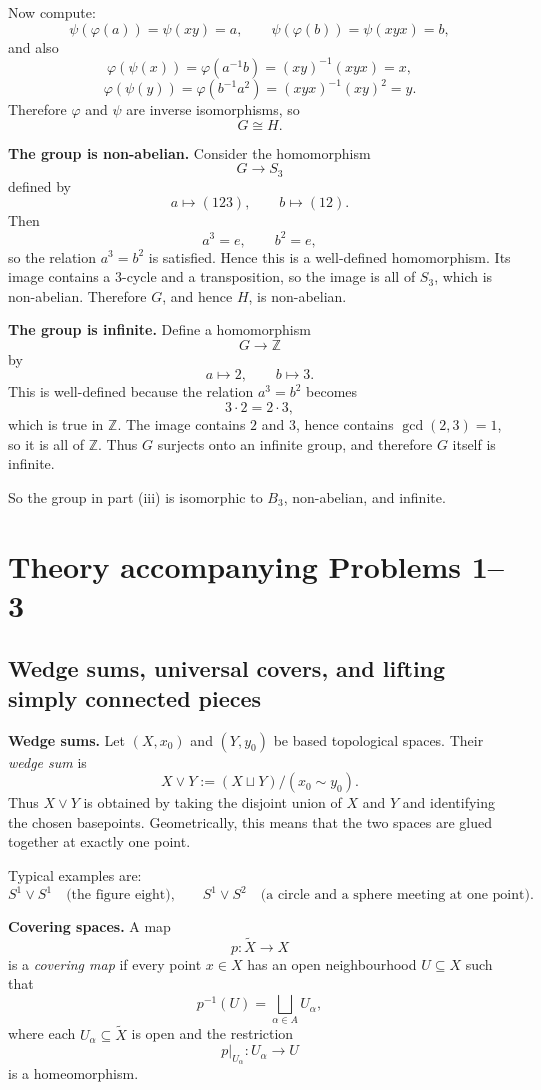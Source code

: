 \documentclass[12pt,a4paper]{article}
\theoremstyle{notespace}
\begin{document}
Now compute:
\[
\psi(\varphi(a))=\psi(xy)=a,\qquad
\psi(\varphi(b))=\psi(xyx)=b,
\]
and also
\[
\varphi(\psi(x))=\varphi(a^{-1}b)=(xy)^{-1}(xyx)=x,
\]
\[
\varphi(\psi(y))=\varphi(b^{-1}a^2)=(xyx)^{-1}(xy)^2=y.
\]
Therefore \(\varphi\) and \(\psi\) are inverse isomorphisms, so
\[
G\cong H.
\]

\textbf{The group is non-abelian.}
Consider the homomorphism
\[
G\to S_3
\]
defined by
\[
a\mapsto (123),\qquad b\mapsto (12).
\]
Then
\[
a^3=e,\qquad b^2=e,
\]
so the relation \(a^3=b^2\) is satisfied. Hence this is a well-defined homomorphism. Its image contains a \(3\)-cycle and a transposition, so the image is all of \(S_3\), which is non-abelian. Therefore \(G\), and hence \(H\), is non-abelian.

\textbf{The group is infinite.}
Define a homomorphism
\[
G\to \mathbb{Z}
\]
by
\[
a\mapsto 2,\qquad b\mapsto 3.
\]
This is well-defined because the relation \(a^3=b^2\) becomes
\[
3\cdot 2 = 2\cdot 3,
\]
which is true in \(\mathbb{Z}\). The image contains \(2\) and \(3\), hence contains \(\gcd(2,3)=1\), so it is all of \(\mathbb{Z}\). Thus \(G\) surjects onto an infinite group, and therefore \(G\) itself is infinite.

So the group in part (iii) is isomorphic to \(B_3\), non-abelian, and infinite.

\section{Theory accompanying Problems 1--3}

\subsection{Wedge sums, universal covers, and lifting simply connected pieces}

\textbf{Wedge sums.}
Let \((X,x_0)\) and \((Y,y_0)\) be based topological spaces. Their \emph{wedge sum} is
\[
X\vee Y := (X\sqcup Y)/(x_0\sim y_0).
\]
Thus \(X\vee Y\) is obtained by taking the disjoint union of \(X\) and \(Y\) and identifying the chosen basepoints. Geometrically, this means that the two spaces are glued together at exactly one point.

Typical examples are:
\[
S^1\vee S^1 \quad\text{(the figure eight),}
\qquad
S^1\vee S^2 \quad\text{(a circle and a sphere meeting at one point).}
\]

\medskip

\textbf{Covering spaces.}
A map
\[
p:\widetilde X\to X
\]
is a \emph{covering map} if every point \(x\in X\) has an open neighbourhood \(U\subseteq X\) such that
\[
p^{-1}(U)=\bigsqcup_{\alpha\in A} U_\alpha,
\]
where each \(U_\alpha\subseteq \widetilde X\) is open and the restriction
\[
p|_{U_\alpha}:U_\alpha\to U
\]
is a homeomorphism.
\end{document}
